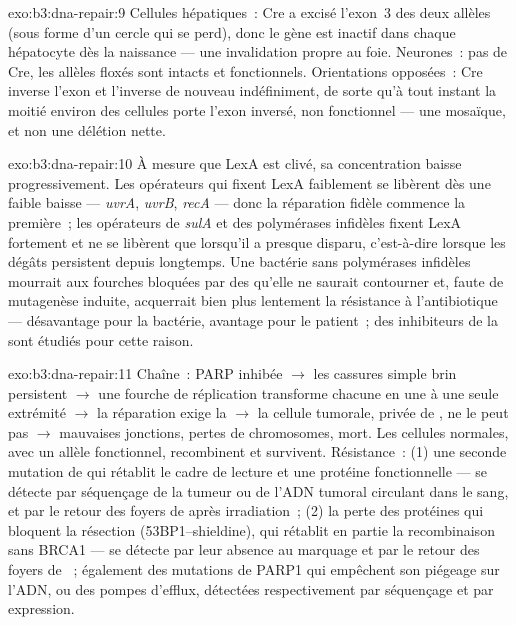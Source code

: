 \begin{solution}{exo:b3:dna-repair:9}
Cellules hépatiques~: Cre a excisé l'exon~3 des deux allèles (sous
forme d'un cercle qui se perd), donc le gène est inactif dans chaque
hépatocyte dès la naissance --- une invalidation propre au foie.
Neurones~: pas de Cre, les allèles floxés sont intacts et
fonctionnels. Orientations opposées~: Cre inverse l'exon et l'inverse
de nouveau indéfiniment, de sorte qu'à tout instant la moitié environ
des cellules porte l'exon inversé, non fonctionnel --- une mosaïque, et
non une délétion nette.
\end{solution}

\begin{solution}{exo:b3:dna-repair:10}
À mesure que LexA est clivé, sa concentration baisse progressivement.
Les opérateurs qui fixent LexA faiblement se libèrent dès une faible
baisse --- \emph{uvrA}, \emph{uvrB}, \emph{recA} --- donc la réparation
fidèle commence la première~; les opérateurs de \emph{sulA} et des
polymérases infidèles fixent LexA fortement et ne se libèrent que
lorsqu'il a presque disparu, c'est-à-dire lorsque les dégâts persistent
depuis longtemps. Une bactérie sans polymérases infidèles mourrait aux
fourches bloquées par des  qu'elle ne saurait contourner et,
faute de mutagenèse induite, acquerrait bien plus lentement la
résistance à l'antibiotique --- désavantage pour la bactérie, avantage
pour le patient~; des inhibiteurs de la  sont étudiés pour
cette raison.
\end{solution}

\begin{solution}{exo:b3:dna-repair:11}
Chaîne~: PARP inhibée $\to$ les cassures simple brin persistent $\to$
une fourche de réplication transforme chacune en une  à une seule extrémité $\to$ la réparation exige la  $\to$ la cellule tumorale, privée de , ne le peut pas
$\to$ mauvaises jonctions, pertes de chromosomes, mort. Les cellules
normales, avec un allèle fonctionnel, recombinent et survivent.
Résistance~: (1) une seconde mutation de \emph{} qui rétablit le
cadre de lecture et une protéine fonctionnelle --- se détecte par
séquençage de la tumeur ou de l'ADN tumoral circulant dans le sang, et
par le retour des foyers de  après irradiation~; (2) la perte des
protéines qui bloquent la résection (53BP1--shieldine), qui rétablit en
partie la recombinaison sans BRCA1 --- se détecte par leur absence au
marquage et par le retour des foyers de ~; également des mutations
de PARP1 qui empêchent son piégeage sur l'ADN, ou des pompes d'efflux,
détectées respectivement par séquençage et par expression.
\end{solution}

